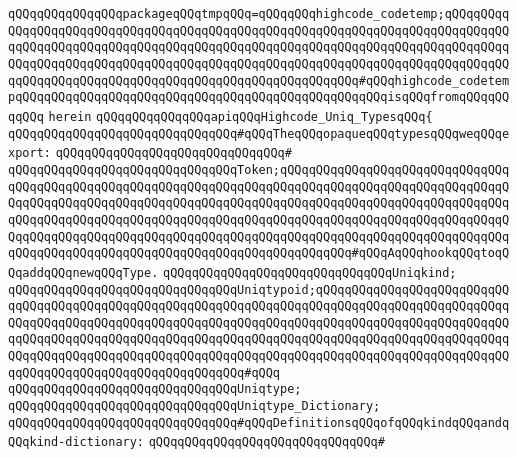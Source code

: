 \verb|qQQqqQQqqQQqqQQqpackageqQQqtmpqQQq=qQQqqQQqhighcode_codetemp;qQQqqQQqqQQqqQQqqQQqqQQqqQQqqQQqqQQqqQQqqQQqqQQqqQQqqQQqqQQqqQQqqQQqqQQqqQQqqQQqqQQqqQQqqQQqqQQqqQQqqQQqqQQqqQQqqQQqqQQqqQQqqQQqqQQqqQQqqQQqqQQqqQQqqQQqqQQqqQQqqQQqqQQqqQQqqQQqqQQqqQQqqQQqqQQqqQQqqQQqqQQqqQQqqQQqqQQqqQQqqQQqqQQqqQQqqQQqqQQqqQQqqQQqqQQqqQQqqQQqqQQqqQQq#qQQqhighcode_codetempqQQqqQQqqQQqqQQqqQQqqQQqqQQqqQQqqQQqqQQqqQQqqQQqqQQqisqQQqfromqQQqqQQqqQQq|\newline
\verb|herein|\newline
\newline
\verb|qQQqqQQqqQQqqQQqapiqQQqHighcode_Uniq_TypesqQQq{|\newline
\newline
\verb|qQQqqQQqqQQqqQQqqQQqqQQqqQQqqQQq#qQQqTheqQQqopaqueqQQqtypesqQQqweqQQqexport:|\newline
\verb|qQQqqQQqqQQqqQQqqQQqqQQqqQQqqQQq#|\newline
\verb|qQQqqQQqqQQqqQQqqQQqqQQqqQQqqQQqToken;qQQqqQQqqQQqqQQqqQQqqQQqqQQqqQQqqQQqqQQqqQQqqQQqqQQqqQQqqQQqqQQqqQQqqQQqqQQqqQQqqQQqqQQqqQQqqQQqqQQqqQQqqQQqqQQqqQQqqQQqqQQqqQQqqQQqqQQqqQQqqQQqqQQqqQQqqQQqqQQqqQQqqQQqqQQqqQQqqQQqqQQqqQQqqQQqqQQqqQQqqQQqqQQqqQQqqQQqqQQqqQQqqQQqqQQqqQQqqQQqqQQqqQQqqQQqqQQqqQQqqQQqqQQqqQQqqQQqqQQqqQQqqQQqqQQqqQQqqQQqqQQqqQQqqQQqqQQqqQQqqQQqqQQqqQQqqQQqqQQqqQQqqQQqqQQqqQQqqQQq#qQQqAqQQqhookqQQqtoqQQqaddqQQqnewqQQqType.|\newline
\verb|qQQqqQQqqQQqqQQqqQQqqQQqqQQqqQQqUniqkind;|\newline
\verb|qQQqqQQqqQQqqQQqqQQqqQQqqQQqqQQqUniqtypoid;qQQqqQQqqQQqqQQqqQQqqQQqqQQqqQQqqQQqqQQqqQQqqQQqqQQqqQQqqQQqqQQqqQQqqQQqqQQqqQQqqQQqqQQqqQQqqQQqqQQqqQQqqQQqqQQqqQQqqQQqqQQqqQQqqQQqqQQqqQQqqQQqqQQqqQQqqQQqqQQqqQQqqQQqqQQqqQQqqQQqqQQqqQQqqQQqqQQqqQQqqQQqqQQqqQQqqQQqqQQqqQQqqQQqqQQqqQQqqQQqqQQqqQQqqQQqqQQqqQQqqQQqqQQqqQQqqQQqqQQqqQQqqQQqqQQqqQQqqQQqqQQqqQQqqQQqqQQqqQQqqQQqqQQqqQQqqQQqqQQq#qQQq|\newline
\verb|qQQqqQQqqQQqqQQqqQQqqQQqqQQqqQQqUniqtype;|\newline
\verb|qQQqqQQqqQQqqQQqqQQqqQQqqQQqqQQqUniqtype_Dictionary;|\newline
\newline
\verb|qQQqqQQqqQQqqQQqqQQqqQQqqQQqqQQq#qQQqDefinitionsqQQqofqQQqkindqQQqandqQQqkind-dictionary:|\newline
\verb|qQQqqQQqqQQqqQQqqQQqqQQqqQQqqQQq#|\newline
